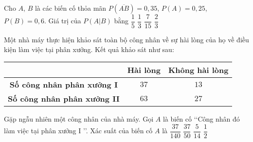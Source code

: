 \begin{ex}
	Cho $A$, $B$ là các biến cố thỏa mãn $P(\overline{AB})=0{,}35$, $P(A)=0{,}25$, $P(B)=0{,}6$. Giá trị của $P(A|B)$ bằng
	\choice
	{$\dfrac{1}{5}$}
	{\True$\dfrac{1}{3}$}
	{$\dfrac{7}{15}$}
	{$\dfrac{2}{3}$}
\end{ex}

\begin{ex}%
	Một nhà máy thực hiện khảo sát toàn bộ công nhân về sự hài lòng của họ về điều kiện làm việc tại phân xưởng. Kết quả khảo sát như sau:
	\begin{center}
	\begin{tabular}{|c|c|c|}
	\hline
	\diagbox {Khảo sát công nhân}{Kết quả khảo sát}	& Hài lòng & Không hài lòng \\
	\hline
	\textbf{Số công nhân phân xưởng I}	& $37$ & $13$ \\
	\hline
	\textbf{Số công nhân phân xưởng II}	& $63$ & $27$\\
	\hline
	\end{tabular}
	\end{center}
	Gặp ngẫu nhiên một công nhân của nhà máy. Gọi $A$ là biến cố \lq\lq  Công nhân đó làm việc tại phân xưởng I \rq\rq.
	Xác suất của biến cố $A$ là
	\choice
	{$\dfrac{37}{140}$}
	{$\dfrac{37}{50}$}
	{\True$\dfrac{5}{14}$}
	{$\dfrac{1}{2}$}
\end{ex}

